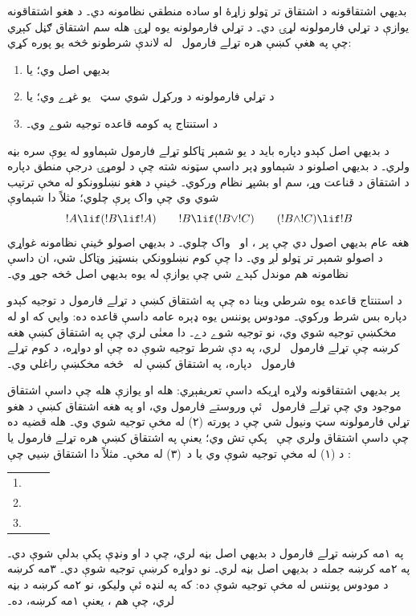 \documentclass[12pt,a4paper,oneside]{report}
\makeatletter
\theoremstyle{definition}
\newenvironment{derivation}{%
  \par\smallskip\begin{LTR}\begin{tabular}{@{}rll@{}}}
  {\end{tabular}\end{LTR}\par\smallskip}
\makeatother
\begin{document}
\label{olpseg:OLP-0068-B006:start}
بديهي اشتقاقونه د اشتقاق تر ټولو زاړۀ او ساده منطقي
نظامونه دي۔ د هغو اشتقاقونه يوازې د تړلي فارمولونه لړۍ دي۔ د
تړلي فارمولونه يوه لړۍ هله سم اشتقاق ګڼل کېږي چې په هغې کښې
هره تړلے فارمول~ له لاندې شرطونو څخه يو پوره کړي:
\begin{enumerate}
\item {} بديهي اصل وي؛ يا
\item {} د تړلي فارمولونه د ورکړل شوي سټ~\LR{$\Gamma$} يو غړے
  وي؛ يا
\item {} د استنتاج په کومه قاعده توجيه شوے وي۔
\end{enumerate}
د بديهي اصل کېدو دپاره  بايد د يو شمېر ټاکلو تړلے فارمول
شېماوو له يوې سره بڼه ولري۔ د بديهي اصلونو د شېماوو ډېر داسې سټونه
شته چې د لومړۍ درجې منطق دپاره د اشتقاق د قناعت وړ، سم او
بشپړ نظام ورکوي۔ ځينې د هغو نښلوونکو له مخې ترتيب شوي وي چې واک پرې
چلوي؛ مثلاً دا شېماوې
\[
!A \lif (!B \lif !A) \qquad !B \lif (!B \lor !C) \qquad (!B \land !C) \lif !B
\]
هغه عام بديهي اصول دي چې پر \LR{$\lif$}، \LR{$\lor$} او~\LR{$\land$} واک چلوي۔ د
بديهي اصولو ځينې نظامونه غواړي د اصولو شمېر تر ټولو لږ وي۔ دا چې
کوم نښلوونکي بنسټيز وټاکل شي، ان داسې نظامونه هم موندل کېدے شي چې
يوازې له يوه بديهي اصل څخه جوړ وي۔
\label{olpseg:OLP-0068-B006:end}

\label{olpseg:OLP-0068-B007:start}
د استنتاج قاعده يوه شرطي وينا ده چې په اشتقاق کښې د
تړلے فارمول د توجيه کېدو دپاره بس شرط ورکوي۔ مودوس پوننس يوه ډېره
عامه داسې قاعده ده: وايي که  او  له مخکښې توجيه
شوي وي، نو  توجيه شوے دے۔ دا معنٰی لري چې په اشتقاق
کښې هغه کرښه چې تړلے فارمول~ لري، په دې شرط توجيه شوې ده چې
 او  دواړه، د کوم تړلے فارمول~ دپاره، په
اشتقاق کښې له~ څخه مخکښې راغلي وي۔
\label{olpseg:OLP-0068-B007:end}

\label{olpseg:OLP-0068-B008:start}
پر بديهي اشتقاقونه ولاړه \LR{$\Proves$} اړيکه داسې تعريفېږي:
 هله او يوازې هله چې داسې اشتقاق موجود
وي چې تړلے فارمول~ ئې وروستے فارمول وي، او \LR{$\Gamma$} په هغه
اشتقاق کښې د هغو تړلي فارمولونه سټ ونيول شي چې د پورته (۲) له
مخې توجيه شوي وي۔  هله قضيه ده چې  داسې اشتقاق
ولري چې~\LR{$\Gamma$} پکې تش وي؛ يعنې په اشتقاق کښې هره
تړلے فارمول يا د (۱) له مخې توجيه شوې وي يا د~(۳) له مخې۔ مثلاً دا
اشتقاق ښيي چې :
\begin{derivation}
  1. & \LR{$!B \lif (!B \lor !A)$} \\
  2. & \LR{$(!B \lif (!B \lor !A)) \lif (!A  \lif (!B \lif (!B \lor !A)))$}\\
  3. & \LR{$!A  \lif (!B \lif (!B \lor !A))$}
\end{derivation}
په ۱مه کرښه تړلے فارمول د بديهي اصل  بڼه
لري، چې د  او  ونډې پکې بدلې شوې دي۔ په ۲مه کرښه جمله د
بديهي اصل  بڼه لري۔ نو دواړه کرښې توجيه شوې
دي۔ ۳مه کرښه د مودوس پوننس له مخې توجيه شوې ده: که په لنډه ئې
 وليکو، نو ۲مه کرښه د  بڼه لري، چې  هم
، يعنې ۱مه کرښه، ده۔
\label{olpseg:OLP-0068-B008:end}
\end{document}
